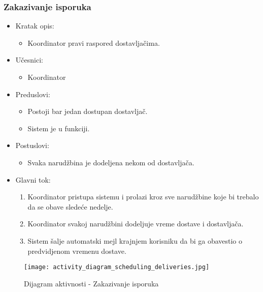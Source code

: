 
\subsubsection{Zakazivanje isporuka}

\begin{itemize}
	\item Kratak opis:
		\begin{itemize}
			\item Koordinator pravi raspored dostavljačima.
		\end{itemize}
	\item Učesnici:
		\begin{itemize}
		    \item Koordinator
		\end{itemize}
	\item Preduslovi:
		\begin{itemize}
		    \item Postoji bar jedan dostupan dostavljač.
		    \item Sistem je u funkciji.
		\end{itemize}
	\item Postuslovi:
		\begin{itemize}
			\item Svaka narudžbina je dodeljena nekom od dostavljača.
	\end{itemize}
	\item Glavni tok:
		\begin{enumerate}
            \item Koordinator pristupa sistemu i prolazi kroz sve narudžbine koje bi trebalo da se obave sledeće nedelje.
           \item Koordinator svakoj narudžbini dodeljuje vreme dostave i dostavljača.
            \item Sistem šalje automatski mejl krajnjem korisniku da bi ga obavestio o predvidjenom vremenu dostave.
		\end{enumerate}
\end{itemize}

\begin{figure}[H]
\begin{center}
\texttt{[image: activity\_diagram\_scheduling\_deliveries.jpg]}
\end{center}
    \caption{Dijagram aktivnosti - Zakazivanje isporuka}
\label{fig:Activity_diagram_scheduling_deliveries}
\end{figure}

